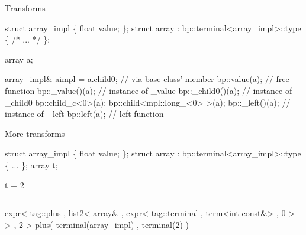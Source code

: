 \begin{frame}[fragile]{Transforms}
\begin{semiverbatim}
struct array_impl \{ float value; \};
struct array : bp::terminal<array_impl>::type
\{ /* ... */ \};

array \alert<2>{a};

\alert<3>{array_impl& aimpl =}
\alert<4>{   a.child0;}          // via base class' member
\alert<5>{   bp::value(a);}      // free function
   \alert<8>{\alert<7>{\alert<6>{bp::_value}()}(a);}   // instance of _value
   \alert<9>{bp::_child0()(a);}  // instance of _child0
   \alert<10>{bp::child_c<0>(a);}
   \alert<11>{bp::child<mpl::long_<0> >(a);}
   \alert<12>{bp::_left()(a);}    // instance of _left
   \alert<13>{bp::left(a);}       // left function
\end{semiverbatim}
\end{frame}


\begin{frame}[fragile]{More transforms}
\begin{semiverbatim}
struct array_impl \{ float value; \};
struct array : bp::terminal<array_impl>::type \{ ... \};
array t;

\alert<4>{\alert<2>{t + 2}}
\begin{columns}[t]
  \alert<3>{expr<
  tag::plus 
, list2<
    array&
  , expr<
      tag::terminal 
    , term<int const&> 
    , 0
    > 
  >
, 2
>}
\alert<5>{plus(
    terminal(array_impl)
  , terminal(2)
)}
\end{columns}



\end{semiverbatim}
\note{ }
\end{frame}


